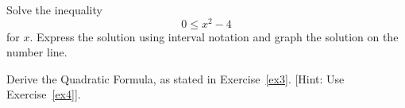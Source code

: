 \documentclass[12pt]{amsart}
\begin{document}
\begin{thm}[16 Points]\label{ex11}
  Solve the inequality $$0 \leq x^2 - 4$$ for $x$.
  Express the solution using interval notation and graph the solution on the number line.
\end{thm}

\newpage

\begin{thm}\label{bonus}
  Derive the Quadratic Formula, as stated in Exercise~\ref{ex3}.
  [Hint: Use Exercise~\ref{ex4}].
\end{thm}
\end{document}
